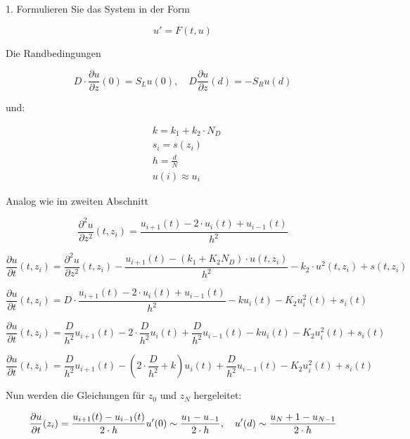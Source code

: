 1. Formulieren Sie das System in der Form

\begin{equation*}
	u' = F(t,u)
\end{equation*}

Die Randbedingungen

\begin{equation}
	D\cdot \frac{\partial u}{\partial z}(0)=S_Lu(0),\quad D\frac{\partial u}{\partial z}(d)=-S_Ru(d)
\end{equation}

und:

\begin{align*}
	&k=k_1+k_2\cdot N_D\\
	&s_i=s(z_i)\\
	&h=\frac{d}{N}\\
	&u(i)\approx u_i
\end{align*}

Analog wie im zweiten Abschnitt

\begin{equation}
	\frac{\partial^2 u}{\partial z^2}(t,z_i) = \frac{u_{i+1}(t) - 2\cdot u_i(t) + u_{i-1}(t)}{h^2}
\end{equation}

\begin{equation}
	\frac{\partial u}{\partial t}(t,z_i) =\frac{\partial^2 u}{\partial z^2}(t,z_i)- \frac{u_{i+1}(t) - (k_1 + K_2N_D)\cdot u(t,z_i)}{h^2} - k_2\cdot u^2(t,z_i) + s(t,z_i)
\end{equation}
	
\begin{equation}
		\frac{\partial u}{\partial t}(t,z_i) = D\cdot \frac{u_{i+1}(t) - 2\cdot u_i(t) + u_{i-1}(t)}{h^2} - ku_i(t) - K_2u^2_i(t) + s_i(t)
\end{equation}
	
\begin{equation}
		\frac{\partial u}{\partial t}(t,z_i) = 	\frac{D}{h^2}u_{i+1}(t) - 2\cdot \frac{D}{h^2}u_i(t) + \frac{D}{h^2}u_{i-1}(t) - ku_i(t) - K_2u^2_i(t) + s_i(t)
\end{equation}
	
\begin{equation}
		\frac{\partial u}{\partial t}(t,z_i) = 	\frac{D}{h^2}u_{i+1}(t) - (2\cdot \frac{D}{h^2} + k)u_i(t) + \frac{D}{h^2}u_{i-1}(t) - K_2u^2_i(t) + s_i(t)
\end{equation}
	
	
Nun werden die Gleichungen für $z_0$ und $z_N$ hergeleitet:
	
\begin{equation}
		\frac{\partial u}{\partial t}(z_i) = \frac{u_{i+1}(t) - u_{i-1}(t)}{2\cdot h}\\
		u'(0) \sim \frac{u_1-u_{-1}}{2\cdot h}, \quad u'(d) \sim \frac{u_N+1-u_{N-1}}{2\cdot h}
\end{equation}
